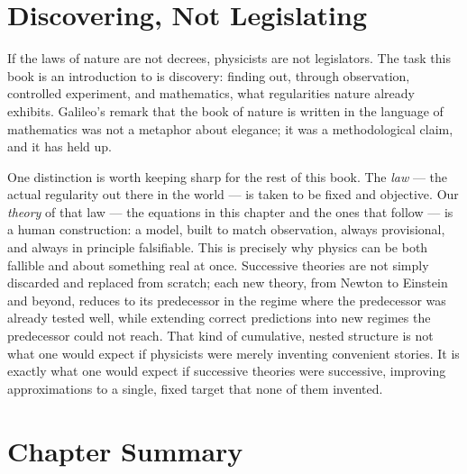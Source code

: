 \section{Discovering, Not Legislating}
\label{sec:discovering}

If the laws of nature are not decrees, physicists are not legislators. The
task this book is an introduction to is discovery: finding out, through
observation, controlled experiment, and mathematics, what regularities
nature already exhibits. Galileo's remark that the book of nature is
written in the language of mathematics was not a metaphor about elegance;
it was a methodological claim, and it has held up.

One distinction is worth keeping sharp for the rest of this book. The
\emph{law} --- the actual regularity out there in the world --- is taken
to be fixed and objective. Our \emph{theory} of that law --- the equations
in this chapter and the ones that follow --- is a human construction: a
model, built to match observation, always provisional, and always in
principle falsifiable. This is precisely why physics can be both fallible
and about something real at once. Successive theories are not simply
discarded and replaced from scratch; each new theory, from Newton to
Einstein and beyond, reduces to its predecessor in the regime where the
predecessor was already tested well, while extending correct predictions
into new regimes the predecessor could not reach. That kind of cumulative,
nested structure is not what one would expect if physicists were merely
inventing convenient stories. It is exactly what one would expect if
successive theories were successive, improving approximations to a single,
fixed target that none of them invented.

\section{Chapter Summary}
\label{sec:reality-summary}

